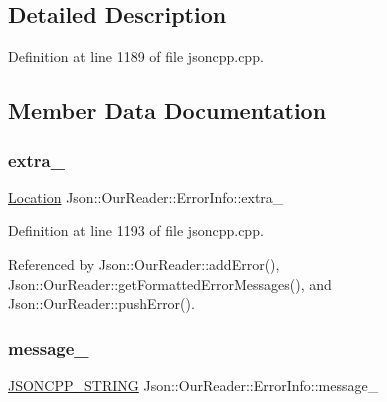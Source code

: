 \subsection{Detailed Description}


Definition at line 1189 of file jsoncpp.\+cpp.



\subsection{Member Data Documentation}
\mbox{\label{class_json_1_1_our_reader_1_1_error_info_a77ba2d32a471c7b9bc14621b76a5bdab}} 
\subsubsection{\texorpdfstring{extra\+\_\+}{extra\_}}
{\footnotesize\ttfamily \hyperlink{class_json_1_1_our_reader_a1bdc7bbc52ba87cae6b19746f2ee0189}{Location} Json\+::\+Our\+Reader\+::\+Error\+Info\+::extra\+\_\+}



Definition at line 1193 of file jsoncpp.\+cpp.



Referenced by Json\+::\+Our\+Reader\+::add\+Error(), Json\+::\+Our\+Reader\+::get\+Formatted\+Error\+Messages(), and Json\+::\+Our\+Reader\+::push\+Error().

\mbox{\label{class_json_1_1_our_reader_1_1_error_info_af14b6bf58ee1cb3388c18ee336ee2394}} 
\subsubsection{\texorpdfstring{message\+\_\+}{message\_}}
{\footnotesize\ttfamily \hyperlink{json_8h_a1e723f95759de062585bc4a8fd3fa4be}{J\+S\+O\+N\+C\+P\+P\+\_\+\+S\+T\+R\+I\+NG} Json\+::\+Our\+Reader\+::\+Error\+Info\+::message\+\_\+}



